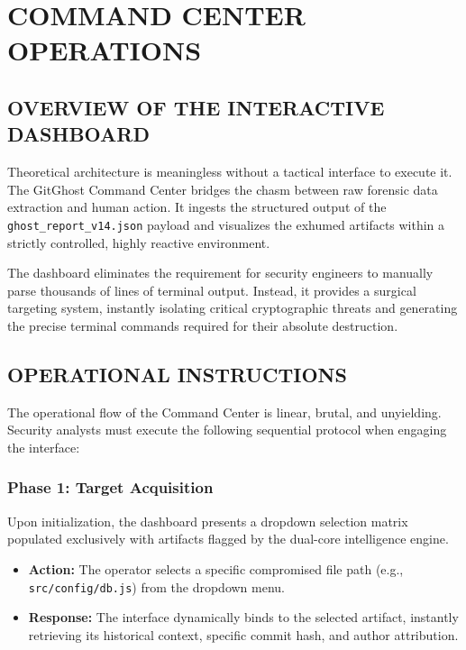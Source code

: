 \documentclass[12pt, a4paper, oneside]{report}
\begin{document}
\chapter{COMMAND CENTER OPERATIONS}

\section{OVERVIEW OF THE INTERACTIVE DASHBOARD}
Theoretical architecture is meaningless without a tactical interface to execute it. The GitGhost Command Center bridges the chasm between raw forensic data extraction and human action. It ingests the structured output of the \texttt{ghost\_report\_v14.json} payload and visualizes the exhumed artifacts within a strictly controlled, highly reactive environment. 

The dashboard eliminates the requirement for security engineers to manually parse thousands of lines of terminal output. Instead, it provides a surgical targeting system, instantly isolating critical cryptographic threats and generating the precise terminal commands required for their absolute destruction.

\section{OPERATIONAL INSTRUCTIONS}
The operational flow of the Command Center is linear, brutal, and unyielding. Security analysts must execute the following sequential protocol when engaging the interface:

\subsection{Phase 1: Target Acquisition}
Upon initialization, the dashboard presents a dropdown selection matrix populated exclusively with artifacts flagged by the dual-core intelligence engine.
\begin{itemize}
    \item \textbf{Action:} The operator selects a specific compromised file path (e.g., \texttt{src/config/db.js}) from the dropdown menu.
    \item \textbf{Response:} The interface dynamically binds to the selected artifact, instantly retrieving its historical context, specific commit hash, and author attribution.
\end{itemize}
\end{document}
